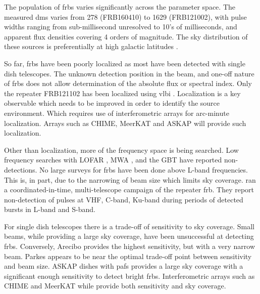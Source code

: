 \documentclass[a4paper,fleqn,usenatbib]{mnras}
\begin{document}
The population of \glspl{frb} varies significantly across the parameter space.
The measured \glspl{dm} varies from 278 (FRB160410) to 1629 (FRB121002), with
pulse widths ranging from sub-millisecond unresolved to 10's of milliseconds,
and apparent flux densities covering 4 orders of magnitude. The sky distribution
of these sources is preferentially at high galactic latitudes
\citep{2015MNRAS.451.3278M}.

So far, \glspl{frb} have been poorly localized as most have been detected with
single dish telescopes. The unknown detection position in the beam, and one-off
nature of \glspl{frb} does not allow determination of the absolute flux or
spectral index. Only the repeater FRB121102 has been localized using \gls{vlbi}
\citep{2017ApJ...834L...8M, 2017ApJ...834L...7T}. Localization is a key
observable which needs to be improved in order to identify the source
environment. Which requires use of interferometric arrays for arc-minute
localization. Arrays such as CHIME, MeerKAT and ASKAP will provide such
localization.

Other than localization, more of the frequency space is being searched. Low
frequency searches with LOFAR \citep{2015MNRAS.452.1254K}, MWA
\citep{2015AJ....150..199T}, and the GBT \citep{2017arXiv170107457C} have
reported non-detections.  No large surveys for \glspl{frb} have been done above
L-band frequencies. This is, in part, due to the narrowing of beam size which
limits sky coverage.  \cite{2017arXiv170507553L} ran a coordinated-in-time,
multi-telescope campaign of the repeater \gls{frb}.  They report non-detection
of pulses at VHF, C-band, Ku-band during periods of detected bursts in L-band
and S-band.

For single dish telescopes there is a trade-off of sensitivity to sky coverage.
Small beams, while providing a large sky coverage, have been unsuccessful at
detecting \glspl{frb}. Conversely, Arecibo provides the highest sensitivity, but
with a very narrow beam. Parkes appears to be near the optimal trade-off point
between sensitivity and beam size.  ASKAP dishes with \glspl{paf} provides a
large sky coverage with a significant enough sensitivity to detect bright
\glspl{frb}. Interferometric arrays such as CHIME and MeerKAT while provide both
sensitivity and sky coverage.
\end{document}
